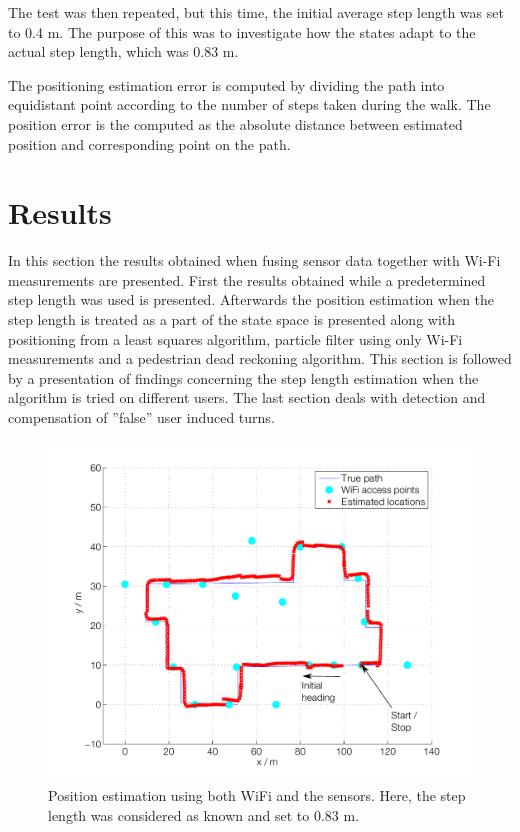 \documentclass{LTHthesis}
\begin{document}
The test was then repeated, but this time, the initial average step length was set to 0.4 m. The purpose of this was to investigate how the states adapt to the actual step length, which was 0.83 m.

The positioning estimation error is computed by dividing the path into equidistant point according to the number of steps taken during the walk. The position error is the computed as the absolute distance between estimated position  and corresponding point on the path. 
%
\section{Results}
%
In this section the results obtained when fusing sensor data together with Wi-Fi measurements are presented. First the results obtained while a predetermined step length was used is presented. Afterwards the position estimation when the step length is treated as a part of the state space is presented along with positioning from a least squares algorithm, particle filter using only Wi-Fi measurements and a pedestrian dead reckoning algorithm. This section is followed by a presentation of findings concerning the step length estimation when the algorithm is tried on different users. The last section deals with detection and compensation of ''false'' user induced turns.   
%
\begin{figure}[!hbt]

\includegraphics[width=1\textwidth ]{images/sensor_fused/path_no_step_est}
\caption{Position estimation using both WiFi and the sensors. Here, the step length was considered as known and set to 0.83 m.}\label{path_no_step_est}
\end{figure}
\end{document}
